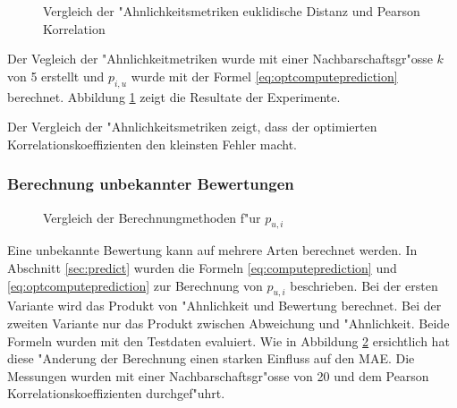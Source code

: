 \documentclass[a4paper, 12pt]{article}
\begin{document}
\begin{figure}
\centering
\caption{Vergleich der "Ahnlichkeitsmetriken euklidische Distanz und Pearson Korrelation}
\label{fig:comparesim1}
\end{figure}

Der Vegleich der "Ahnlichkeitmetriken wurde mit einer Nachbarschaftsgr"osse $k$ von 5 erstellt und $p_{i,u}$ wurde mit der Formel \ref{eq:optcomputeprediction} berechnet. Abbildung \ref{fig:comparesim1} zeigt die Resultate der Experimente.

Der Vergleich der "Ahnlichkeitsmetriken zeigt, dass der optimierten Korrelationskoeffizienten den kleinsten Fehler macht.


\subsubsection{Berechnung unbekannter Bewertungen}
\label{sec:eqpredictresults}

\begin{figure}
\centering
\caption{Vergleich der Berechnungmethoden f"ur $p_{u,i}$}
\label{fig:predicteq}
\end{figure}

Eine unbekannte Bewertung kann auf mehrere Arten berechnet werden. In Abschnitt \ref{sec:predict} wurden die Formeln \ref{eq:computeprediction} und \ref{eq:optcomputeprediction} zur Berechnung  von $p_{u,i}$ beschrieben. Bei der ersten Variante wird das Produkt von "Ahnlichkeit und Bewertung berechnet. Bei der zweiten Variante nur das Produkt zwischen Abweichung und "Ahnlichkeit. Beide Formeln wurden mit den Testdaten evaluiert. Wie in Abbildung \ref{fig:predicteq} ersichtlich hat diese "Anderung der Berechnung einen starken Einfluss auf den MAE. Die Messungen wurden mit einer Nachbarschaftsgr"osse von 20 und dem Pearson Korrelationskoeffizienten durchgef"uhrt.
\end{document}

